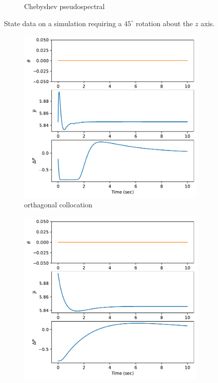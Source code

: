 \documentclass[]{article}
\begin{document}
\begin{figure}[H]
\begin{subfigure}[b]{0.3\textwidth}
		\caption{Chebyshev pseudospectral}
	\end{subfigure}
	\caption{State data on a simulation requiring a $45^{\circ}$ rotation about the $z$ axis.}
	\label{fig:state45z}
\end{figure}

\begin{figure}[H]
	\centering
	\begin{subfigure}[b]{0.3\textwidth}
		\centering
		\includegraphics[width=\textwidth]{control45dz4.pdf}
		\caption{orthagonal collocation}
	\end{subfigure}%
	\begin{subfigure}[b]{0.3\textwidth}
		\centering
		\includegraphics[width=\textwidth]{control45dz6.pdf}

\end{subfigure}
\end{figure}
\end{document}
